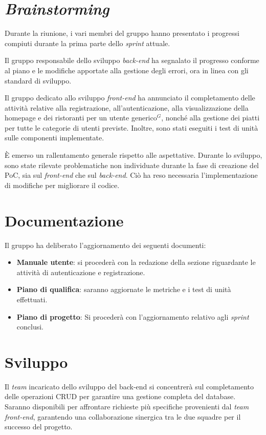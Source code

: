 \section{\textit{Brainstorming}}
Durante la riunione, i vari membri del gruppo hanno presentato i progressi compiuti 
durante la prima parte dello \textit{sprint} attuale.

Il gruppo responsabile dello sviluppo \textit{back-end} ha segnalato il progresso conforme al piano 
e le modifiche apportate alla gestione degli errori, ora in linea con gli standard di sviluppo.

Il gruppo dedicato allo sviluppo \textit{front-end} ha annunciato il completamento delle attività relative 
alla registrazione, all'autenticazione, alla visualizzazione della homepage e dei ristoranti per un utente generico$^G$, 
nonché alla gestione dei piatti per tutte le categorie di utenti previste. Inoltre, sono stati eseguiti i test di unità sulle componenti implementate.

È emerso un rallentamento generale rispetto alle aspettative. Durante lo sviluppo, sono state rilevate problematiche 
non individuate durante la fase di creazione del PoC, sia sul \textit{front-end} che sul \textit{back-end}. 
Ciò ha reso necessaria l'implementazione di modifiche per migliorare il codice.


\section{Documentazione}
Il gruppo ha deliberato l'aggiornamento dei seguenti documenti:
\begin{itemize}
    \item \textbf{Manuale utente}: si procederà con la redazione della sezione riguardante le attività di autenticazione e registrazione.
    \item \textbf{Piano di qualifica}: saranno aggiornate le metriche e i test di unità effettuati.
    \item \textbf{Piano di progetto}: Si procederà con l'aggiornamento relativo agli \textit{sprint} conclusi.
\end{itemize}


\section{Sviluppo}
Il \textit{team} incaricato dello sviluppo del back-end si concentrerà sul completamento delle operazioni CRUD 
per garantire una gestione completa del database. Saranno disponibili per affrontare richieste più 
specifiche provenienti dal \textit{team} \textit{front-end}, garantendo una collaborazione sinergica tra le due squadre 
per il successo del progetto.


